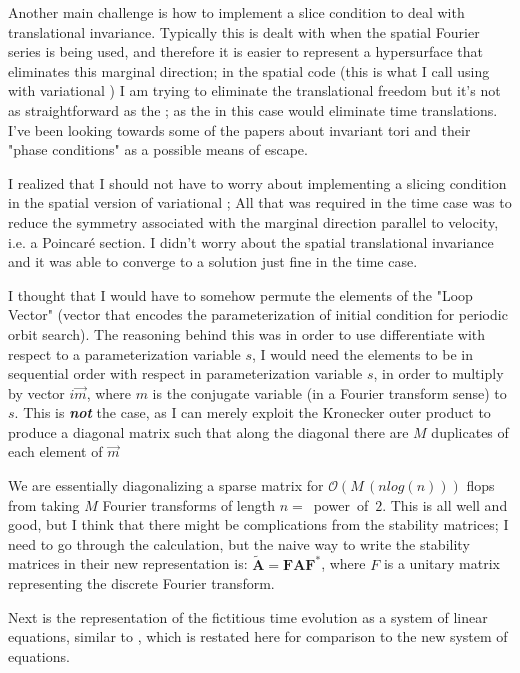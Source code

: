 Another main challenge is how to implement a slice condition to deal with translational
invariance. Typically this is dealt with when the spatial Fourier series is being used, and
therefore it is easier to represent a hypersurface that eliminates this marginal direction; in
the spatial {\descent} code (this is what I call using  with variational
{\descent}) I am trying to eliminate the translational freedom but it's not as straightforward as
the {\fFslice}; as the {\fFslice} in this case would eliminate time translations.
I've been looking towards some of the papers about invariant tori and their "phase conditions" as a
possible means of escape.

I realized that I should not have to worry about implementing a slicing condition
in the spatial version of variational {\descent}; All that was required in the
time case was to reduce the symmetry associated with the marginal direction parallel to
velocity, i.e. a Poincar\'e section. I didn't worry about the spatial translational invariance
and it was able to converge to a solution just fine in the time case.

I thought that I would have to somehow permute the elements  of the "Loop Vector" (vector that
encodes the parameterization of initial condition for periodic orbit search). The reasoning behind this
was in order to use differentiate with respect to a parameterization variable $s$, I would need
the elements to be in sequential order with respect in parameterization variable $s$, in order to
multiply by vector $i \vec{m}$, where $m$ is the conjugate variable (in a Fourier transform sense)
to $s$. This is \textbf{\emph{not}}
the case, as I can merely exploit the Kronecker outer product to produce a diagonal matrix such that
along the diagonal there are $M$ duplicates of each element of $\vec{m}$

We are essentially diagonalizing a sparse matrix for $\mathcal{O}(M\,(n log(n)))$ flops
from taking $M$ Fourier transforms of length $n =$~power~of~$2$.
This is all well and good, but I think that there might be complications from the stability matrices;
I need to go through the calculation, but the naive way to write the
stability matrices in their new representation is:
 $\tilde{\mathbf{A}} = \mathbf{F} \mathbf{A} \mathbf{F^{*}}$, where $F$
is a unitary matrix representing the discrete Fourier transform.

Next is the representation of the fictitious time evolution as a system of linear equations, similar to
, which is restated here for comparison to the new system of equations.

